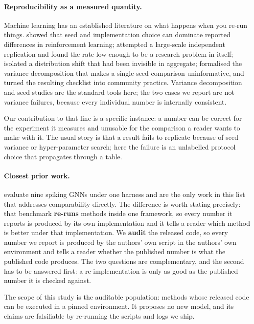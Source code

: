 \documentclass[10pt,twocolumn]{article}
\begin{document}
\paragraph{Reproducibility as a measured quantity.} Machine learning has an established literature
on what happens when you re-run things. \citet{henderson2018deep} showed that seed and implementation
choice can dominate reported differences in reinforcement learning; \citet{raff2019step} attempted a
large-scale independent replication and found the rate low enough to be a research problem in itself;
\citet{recht2019imagenet} isolated a distribution shift that had been invisible in aggregate;
\citet{bouthillier2021accounting} formalised the variance decomposition that makes a single-seed
comparison uninformative, and \citet{pineau2021improving} turned the resulting checklist into
community practice. Variance decomposition and seed studies are the standard tools here; the two
cases we report are not variance failures, because every individual number is internally consistent.

Our contribution to that line is a specific instance: a number can be correct for the experiment it
measures and unusable for the comparison a reader wants to make with it. The usual story is that a
result fails to replicate because of seed variance or hyper-parameter search; here the failure is an
unlabelled protocol choice that propagates through a table.

\paragraph{Closest prior work.} \citet{zhang2025sgnnbench} evaluate nine spiking GNNs under one
harness and are the only work in this list that addresses comparability directly. The difference is
worth stating precisely: that benchmark \textbf{re-runs} methods inside one framework, so every
number it reports is produced by its own implementation and it tells a reader which method is better
under that implementation. We \textbf{audit} the released code, so every number we report is
produced by the authors' own script in the authors' own environment and tells a reader whether the
published number is what the published code produces. The two questions are complementary, and the
second has to be answered first: a re-implementation is only as good as the published number it is
checked against.

The scope of this study is the auditable population: methods whose released code can be executed in a
pinned environment. It proposes no new model, and its claims are falsifiable by re-running the
scripts and logs we ship.
\end{document}
